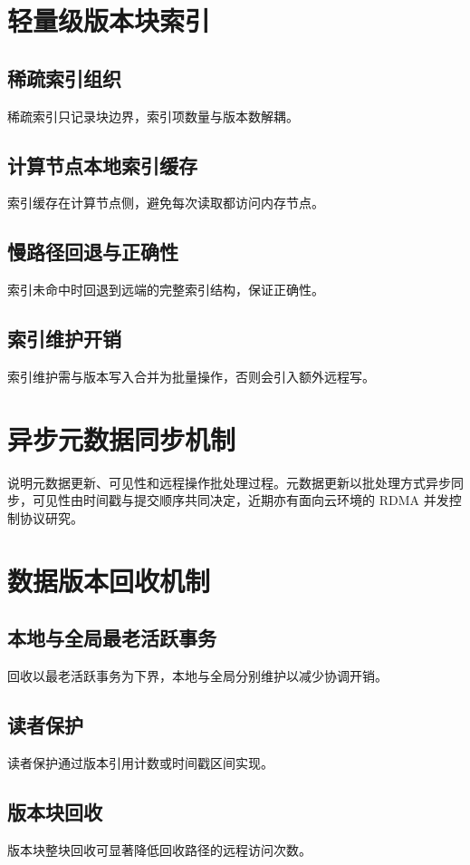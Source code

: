 \section{轻量级版本块索引}
\subsection{稀疏索引组织}
稀疏索引只记录块边界，索引项数量与版本数解耦\cite{zuoOne2021,wangSherman2022}。
\subsection{计算节点本地索引缓存}
索引缓存在计算节点侧，避免每次读取都访问内存节点\cite{luoSmart2023,anMarlin2023}。
\subsection{慢路径回退与正确性}
索引未命中时回退到远端的完整索引结构，保证正确性\cite{wangOptimizing2024,liRolex2023}。
\subsection{索引维护开销}
索引维护需与版本写入合并为批量操作，否则会引入额外远程写\cite{minSephash2024,luDex2024}。

\section{异步元数据同步机制}
说明元数据更新、可见性和远程操作批处理过程。元数据更新以批处理方式异步同步\cite{weiUnifying2021,chenFast2016}，可见性由时间戳与提交顺序共同决定\cite{weiUnifying2021}，近期亦有面向云环境的 RDMA 并发控制协议研究\cite{wangRdma2023}。
\section{数据版本回收机制}
\subsection{本地与全局最老活跃事务}
回收以最老活跃事务为下界，本地与全局分别维护以减少协调开销\cite{bernsteinConcurrency1987,tuSpeedy2013}。
\subsection{读者保护}
读者保护通过版本引用计数或时间戳区间实现\cite{luSnow2016,weiUnifying2021}。
\subsection{版本块回收}
版本块整块回收可显著降低回收路径的远程访问次数\cite{zhangMotor2024}。

